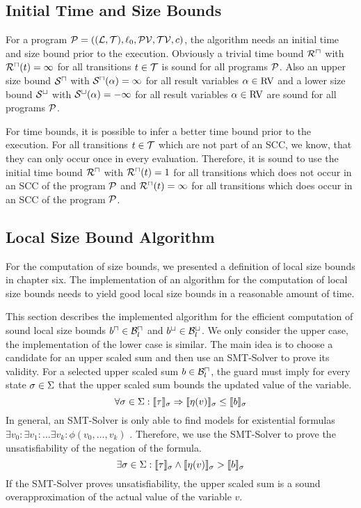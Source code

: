 \subsection{Initial Time and Size Bounds}

For a program $\mathcal{P} = ((\mathcal{L}, \mathcal{T}), \ell_0, \mathcal{PV}, \mathcal{TV}, c)$, the algorithm needs an initial time and size bound prior to the execution.
Obviously a trivial time bound ${\mathcal{R}^\sqcap}$ with ${\mathcal{R}^\sqcap}(t) = \infty$ for all transitions $t \in \mathcal{T}$ is sound for all programs $\mathcal{P}$.
Also an upper size bound ${\mathcal{S}^\sqcap}$ with ${\mathcal{S}^\sqcap}(\alpha) = \infty$ for all result variables $\alpha \in \text{RV}$ and a lower size bound ${\mathcal{S}^\sqcup}$ with ${\mathcal{S}^\sqcup}(\alpha) = -\infty$ for all result variables $\alpha \in \text{RV}$ are sound for all programs $\mathcal{P}$.

For time bounds, it is possible to infer a better time bound prior to the execution.
For all transitions $t \in \mathcal{T}$ which are not part of an SCC, we know, that they can only occur once in every evaluation.
Therefore, it is sound to use the initial time bound ${\mathcal{R}^\sqcap}$ with ${\mathcal{R}^\sqcap}(t) = 1$ for all transitions which does not occur in an SCC of the program $\mathcal{P}$ and ${\mathcal{R}^\sqcap}(t) = \infty$ for all transitions which does occur in an SCC of the program $\mathcal{P}$.

\subsection{Local Size Bound Algorithm}

For the computation of size bounds, we presented a definition of local size bounds in chapter six.
The implementation of an algorithm for the computation of local size bounds needs to yield good local size bounds in a reasonable amount of time.

This section describes the implemented algorithm for the efficient computation of sound local size bounds $b^\sqcap \in \mathcal{B}^\sqcap_l$ and $b^\sqcup \in \mathcal{B}^\sqcup_l$.
We only consider the upper case, the implementation of the lower case is similar.
The main idea is to choose a candidate for an upper scaled sum and then use an SMT-Solver to prove its validity.
For a selected upper scaled sum $b \in \mathcal{B}^\sqcap_l$, the guard must imply for every state $\sigma \in \Sigma$ that the upper scaled sum bounds the updated value of the variable.
\[ \forall \sigma \in \Sigma: \llbracket \tau \rrbracket_{\sigma} \Rightarrow \llbracket \eta(v) \rrbracket_{\sigma} \leq \llbracket b \rrbracket_{\sigma} \]
In general, an SMT-Solver is only able to find models for existential formulas $\exists v_0: \exists v_1: \dots \exists v_k: \phi(v_0, \dots, v_k)$ \cite{smt}.
Therefore, we use the SMT-Solver to prove the unsatisfiability of the negation of the formula.
\[ \exists \sigma \in \Sigma: \llbracket \tau \rrbracket_{\sigma} \wedge \llbracket \eta(v) \rrbracket_{\sigma} > \llbracket b \rrbracket_{\sigma} \]
If the SMT-Solver proves unsatisfiability, the upper scaled sum is a sound overapproximation of the actual value of the variable $v$.

